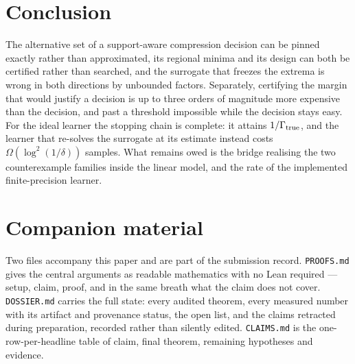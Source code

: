 \section{Conclusion}

The alternative set of a support-aware compression decision can be pinned exactly rather
than approximated, its regional minima and its design can both be certified rather than
searched, and the surrogate that freezes the extrema is wrong in both directions by
unbounded factors. Separately, certifying the margin that would justify a decision is up to
three orders of magnitude more expensive than the decision, and past a threshold impossible
while the decision stays easy. For the ideal learner the stopping chain is complete: it attains $1/\Gamma_{\rm true}$, and
the learner that re-solves the surrogate at its estimate instead costs
$\Omega(\log^{2}(1/\delta))$ samples. What remains owed is the bridge realising the two
counterexample families inside the linear model, and the rate of the implemented
finite-precision learner.

\section*{Companion material}
Two files accompany this paper and are part of the submission record.
\texttt{PROOFS.md} gives the central arguments as readable mathematics with no Lean
required --- setup, claim, proof, and in the same breath what the claim does not
cover. \texttt{DOSSIER.md} carries the full state: every audited theorem, every
measured number with its artifact and provenance status, the open list, and the
claims retracted during preparation, recorded rather than silently edited.
\texttt{CLAIMS.md} is the one-row-per-headline table of claim, final theorem,
remaining hypotheses and evidence.

